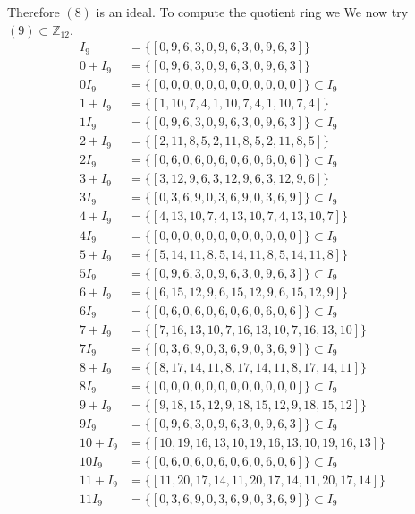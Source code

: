 \documentclass[11pt]{amsart}
\begin{document}
Therefore $(8)$ is an ideal.
To compute the quotient ring we
We now try $(9) \subset \mathbb{Z}_{12}$.
\begin{equation*}
\begin{aligned}
I_9 &= \{[0, 9, 6, 3, 0, 9, 6, 3, 0, 9, 6, 3]\} \\
0+ I_9 &= \{[0, 9, 6, 3, 0, 9, 6, 3, 0, 9, 6, 3]\}\\
0 I_9 &= \{[0, 0, 0, 0, 0, 0, 0, 0, 0, 0, 0, 0]\} \subset I_9 \\
1+ I_9 &= \{[1, 10, 7, 4, 1, 10, 7, 4, 1, 10, 7, 4]\}\\
1 I_9 &= \{[0, 9, 6, 3, 0, 9, 6, 3, 0, 9, 6, 3]\} \subset I_9 \\
2+ I_9 &= \{[2, 11, 8, 5, 2, 11, 8, 5, 2, 11, 8, 5]\}\\
2 I_9 &= \{[0, 6, 0, 6, 0, 6, 0, 6, 0, 6, 0, 6]\} \subset I_9 \\
3+ I_9 &= \{[3, 12, 9, 6, 3, 12, 9, 6, 3, 12, 9, 6]\}\\
3 I_9 &= \{[0, 3, 6, 9, 0, 3, 6, 9, 0, 3, 6, 9]\} \subset I_9 \\
4+ I_9 &= \{[4, 13, 10, 7, 4, 13, 10, 7, 4, 13, 10, 7]\}\\
4 I_9 &= \{[0, 0, 0, 0, 0, 0, 0, 0, 0, 0, 0, 0]\} \subset I_9 \\
5+ I_9 &= \{[5, 14, 11, 8, 5, 14, 11, 8, 5, 14, 11, 8]\}\\
5 I_9 &= \{[0, 9, 6, 3, 0, 9, 6, 3, 0, 9, 6, 3]\} \subset I_9 \\
6+ I_9 &= \{[6, 15, 12, 9, 6, 15, 12, 9, 6, 15, 12, 9]\}\\
6 I_9 &= \{[0, 6, 0, 6, 0, 6, 0, 6, 0, 6, 0, 6]\} \subset I_9 \\
7+ I_9 &= \{[7, 16, 13, 10, 7, 16, 13, 10, 7, 16, 13, 10]\}\\
7 I_9 &= \{[0, 3, 6, 9, 0, 3, 6, 9, 0, 3, 6, 9]\} \subset I_9 \\
8+ I_9 &= \{[8, 17, 14, 11, 8, 17, 14, 11, 8, 17, 14, 11]\}\\
8 I_9 &= \{[0, 0, 0, 0, 0, 0, 0, 0, 0, 0, 0, 0]\} \subset I_9 \\
9+ I_9 &= \{[9, 18, 15, 12, 9, 18, 15, 12, 9, 18, 15, 12]\}\\
9 I_9 &= \{[0, 9, 6, 3, 0, 9, 6, 3, 0, 9, 6, 3]\} \subset I_9 \\
10+ I_9 &= \{[10, 19, 16, 13, 10, 19, 16, 13, 10, 19, 16, 13]\}\\
10 I_9 &= \{[0, 6, 0, 6, 0, 6, 0, 6, 0, 6, 0, 6]\} \subset I_9 \\
11+ I_9 &= \{[11, 20, 17, 14, 11, 20, 17, 14, 11, 20, 17, 14]\}\\
11 I_9 &= \{[0, 3, 6, 9, 0, 3, 6, 9, 0, 3, 6, 9]\} \subset I_9 \\
\end{aligned}
\end{equation*}
\end{document}
